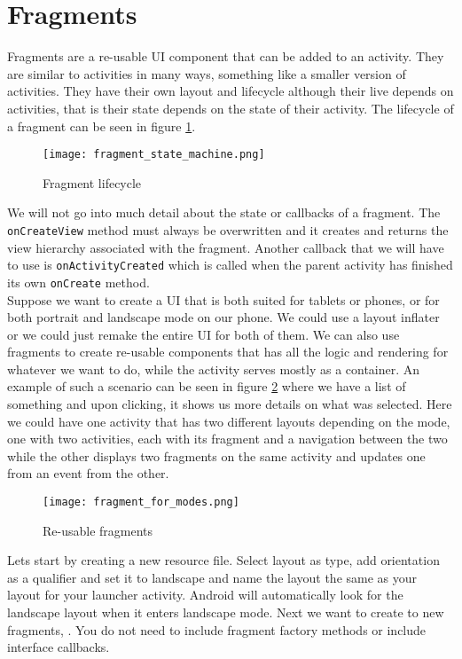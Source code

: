 \section{Fragments}
Fragments are a re-usable UI component that can be added to an activity. They are similar to activities in many ways, something like a smaller version of activities. They have their own layout and lifecycle although their live depends on activities, that is their state depends on the state of their activity. The lifecycle of a fragment can be seen in figure \ref{fig:flife}.

\begin{figure}[H]
\centering
\texttt{[image: fragment\_state\_machine.png]}
\caption{Fragment lifecycle}
\label{fig:flife}
\end{figure}

We will not go into much detail about the state or callbacks of a fragment. The \texttt{onCreateView} method must always be overwritten and it creates and returns the view hierarchy associated with the fragment. Another callback that we will have to use is \texttt{onActivityCreated} which is called when the parent activity has finished its own \texttt{onCreate} method.\\

Suppose we want to create a UI that is both suited for tablets or phones, or for both portrait and landscape mode on our phone. We could use a layout inflater or we could just remake the entire UI for both of them. We can also use fragments to create re-usable components that has all the logic and rendering for whatever we want to do, while the activity serves mostly as a container. An example of such a scenario can be seen in figure \ref{fig:freuse} where we have a list of something and upon clicking, it shows us more details on what was selected. Here we could have one activity that has two different layouts depending on the mode, one with two activities, each with its fragment and a navigation between the two while the other displays two fragments on the same activity and updates one from an event from the other.

\begin{figure}[H]
\centering
\texttt{[image: fragment\_for\_modes.png]}
\caption{Re-usable fragments}
\label{fig:freuse}
\end{figure}

Lets start by creating a new resource file. Select layout as type, add orientation as a qualifier and set it to landscape and name the layout the same as your layout for your launcher activity. Android will automatically look for the landscape layout when it enters landscape mode. Next we want to create to new fragments, . You do not need to include fragment factory methods or include interface callbacks.\\

